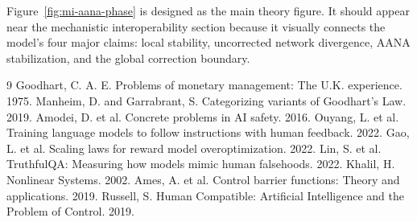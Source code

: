 \documentclass[11pt]{article}
\begin{document}
Figure~\ref{fig:mi-aana-phase} is designed as the main theory figure. It should appear near the mechanistic interoperability section because it visually connects the model's four major claims: local stability, uncorrected network divergence, AANA stabilization, and the global correction boundary.

\begin{thebibliography}{9}
 Goodhart, C. A. E. Problems of monetary management: The U.K. experience. 1975.
 Manheim, D. and Garrabrant, S. Categorizing variants of Goodhart's Law. 2019.
 Amodei, D. et al. Concrete problems in AI safety. 2016.
 Ouyang, L. et al. Training language models to follow instructions with human feedback. 2022.
 Gao, L. et al. Scaling laws for reward model overoptimization. 2022.
 Lin, S. et al. TruthfulQA: Measuring how models mimic human falsehoods. 2022.
 Khalil, H. Nonlinear Systems. 2002.
 Ames, A. et al. Control barrier functions: Theory and applications. 2019.
 Russell, S. Human Compatible: Artificial Intelligence and the Problem of Control. 2019.
\end{thebibliography}
\end{document}
